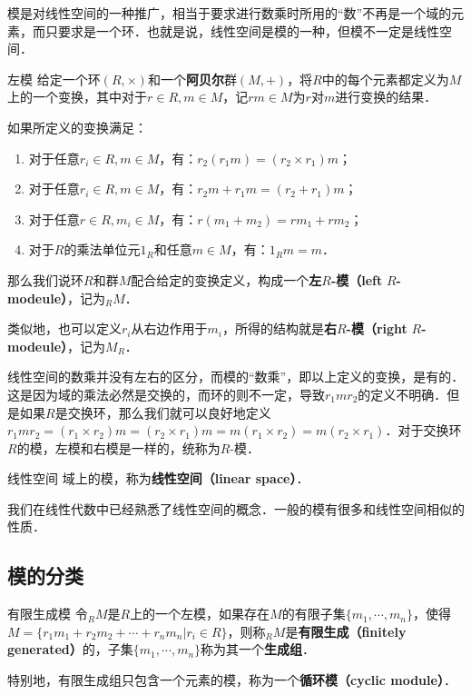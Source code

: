

模是对线性空间的一种推广，相当于要求进行数乘时所用的“数”不再是一个域的元素，而只要求是一个环．也就是说，线性空间是模的一种，但模不一定是线性空间．

\begin{definition}{左模}
给定一个环$(R, \times)$和一个\textbf{阿贝尔}群$(M, +)$，将$R$中的每个元素都定义为$M$上的一个变换，其中对于$r\in R, m\in M$，记$rm\in M$为$r$对$m$进行变换的结果．

如果所定义的变换满足：
\begin{enumerate}
\item 对于任意$r_i\in R, m\in M$，有：$r_2(r_1m)=(r_2\times r_1)m$；
\item 对于任意$r_i\in R, m\in M$，有：$r_2m+r_1m=(r_2+r_1)m$；
\item 对于任意$r\in R, m_i\in M$，有：$r(m_1+m_2)=rm_1+rm_2$；
\item 对于$R$的乘法单位元$1_R$和任意$m\in M$，有：$1_Rm=m$．
\end{enumerate}

那么我们说环$R$和群$M$配合给定的变换定义，构成一个\textbf{左}$R$\textbf{-模（left} $R$\textbf{-modeule）}，记为$_RM$．
\end{definition}

类似地，也可以定义$r_i$从右边作用于$m_i$，所得的结构就是\textbf{右}$R$\textbf{-模（right} $R$\textbf{-modeule）}，记为$M_R$．

线性空间的数乘并没有左右的区分，而模的“数乘”，即以上定义的变换，是有的．这是因为域的乘法必然是交换的，而环的则不一定，导致$r_1mr_2$的定义不明确．但是如果$R$是交换环，那么我们就可以良好地定义$r_1mr_2=(r_1\times r_2)m=(r_2\times r_1)m=m(r_1\times r_2)=m(r_2\times r_1)$．对于交换环$R$的模，左模和右模是一样的，统称为$R$-模．

\begin{definition}{线性空间}
域上的模，称为\textbf{线性空间（linear space）}．
\end{definition}

我们在线性代数中已经熟悉了线性空间的概念．一般的模有很多和线性空间相似的性质．

\subsection{模的分类}

\begin{definition}{有限生成模}
令$_RM$是$R$上的一个左模，如果存在$M$的有限子集$\{m_1, \cdots, m_n\}$，使得$M=\{r_1m_1+r_2m_2+\cdots+r_nm_n|r_i\in R\}$，则称$_RM$是\textbf{有限生成（finitely generated）}的，子集$\{m_1, \cdots, m_n\}$称为其一个\textbf{生成组}．

特别地，有限生成组只包含一个元素的模，称为一个\textbf{循环模（cyclic module）}．
\end{definition}


